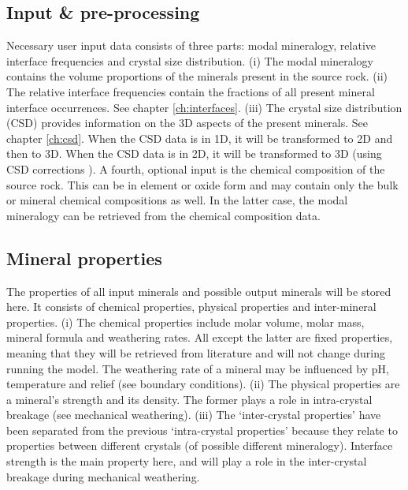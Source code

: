     \subsection{Input \& pre-processing}
    Necessary user input data consists of three parts: modal mineralogy, relative interface frequencies and crystal size distribution. %
    (i) The modal mineralogy contains the volume proportions of the minerals present in the source rock. %
    (ii) The relative interface frequencies contain the fractions of all present mineral interface occurrences. %
    See chapter \ref{ch:interfaces}. %
    (iii) The crystal size distribution (CSD) provides information on the 3D aspects of the present minerals. %
    See chapter \ref{ch:csd}. %
    When the CSD data is in 1D, it will be transformed to 2D and then to 3D. %
    When the CSD data is in 2D, it will be transformed to 3D (using CSD corrections \cite{Higgins_2010}). %
    A fourth, optional input is the chemical composition of the source rock. %
    This can be in element or oxide form and may contain only the bulk or mineral chemical compositions as well. %
    In the latter case, the modal mineralogy can be retrieved from the chemical composition data. %

    \subsection{Mineral properties}
    The properties of all input minerals and possible output minerals will be stored here. %
    It consists of chemical properties, physical properties and inter-mineral properties. %
    (i) The chemical properties include molar volume, molar mass, mineral formula and weathering rates. %
    All except the latter are fixed properties, meaning that they will be retrieved from literature and will not change during running the model. %
    The weathering rate of a mineral may be influenced by pH, temperature and relief (see boundary conditions). %
    (ii) The physical properties are a mineral’s strength and its density. %
    The former plays a role in intra-crystal breakage (see mechanical weathering). %
    (iii) The ‘inter-crystal properties’ have been separated from the previous ‘intra-crystal properties’ because they relate to properties between different crystals (of possible different mineralogy). %
    Interface strength is the main property here, and will play a role in the inter-crystal breakage during mechanical weathering. %
    \linebreak

